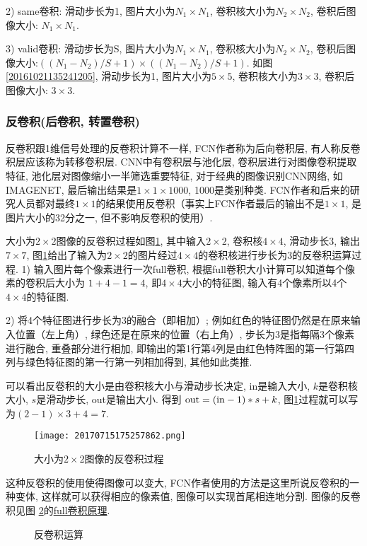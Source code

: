 2) same卷积: 滑动步长为1, 图片大小为$N_1\times N_1$, 卷积核大小为$N_2\times N_2$, 卷积后图像大小: $N_1\times N_1$.

3) valid卷积: 滑动步长为S, 图片大小为$N_1\times N_1$, 卷积核大小为$N_2\times N_2$, 卷积后图像大小:$((N_1-N_2)/S+1) \times ((N_1-N_2)/S+1)$.
如图 \ref{20161021135241205}, 滑动步长为1, 图片大小为$5\times 5$, 卷积核大小为$3\times 3$, 卷积后图像大小: $3\times 3$.

\subsubsection{反卷积(后卷积, 转置卷积)}

反卷积跟1维信号处理的反卷积计算不一样, FCN作者称为后向卷积层, 有人称反卷积层应该称为转移卷积层.
CNN中有卷积层与池化层, 卷积层进行对图像卷积提取特征, 池化层对图像缩小一半筛选重要特征, 对于经典的图像识别CNN网络, 如IMAGENET, 最后输出结果是$1\times 1\times 1000$, 1000是类别种类.
FCN作者和后来的研究人员都对最终$1\times 1$的结果使用反卷积（事实上FCN作者最后的输出不是$1\times 1$, 是图片大小的32分之一, 但不影响反卷积的使用）.
\begin{example}
大小为$2\times 2$图像的反卷积过程如图\ref{20170715175257862}, 其中输入$2\times 2$, 卷积核$4\times 4$, 滑动步长3, 输出$7\times 7$, 图\ref{20170715175257862}给出了输入为$2\times 2$的图片经过$4\times 4$的卷积核进行步长为3的反卷积运算过程.
1) 输入图片每个像素进行一次full卷积, 根据full卷积大小计算可以知道每个像素的卷积后大小为 $1+4-1=4$,  即$4\times 4$大小的特征图, 输入有4个像素所以4个$4\times 4$的特征图.

2) 将4个特征图进行步长为3的融合（即相加）; 例如红色的特征图仍然是在原来输入位置（左上角）, 绿色还是在原来的位置（右上角）, 步长为3是指每隔3个像素进行融合, 重叠部分进行相加, 即输出的第1行第4列是由红色特阵图的第一行第四列与绿色特征图的第一行第一列相加得到, 其他如此类推.

可以看出反卷积的大小是由卷积核大小与滑动步长决定, in是输入大小, $k$是卷积核大小, $s$是滑动步长, out是输出大小.
得到 $\textup{out} = (\textup{in} - 1) * s + k$, 图\ref{20170715175257862}过程就可以写为$(2 - 1)\times 3 + 4 = 7$.
\begin{figure}[H]
\centering
\texttt{[image: 20170715175257862.png]}
\caption{大小为$2\times 2$图像的反卷积过程}
\label{20170715175257862}
\end{figure}
\end{example}
这种反卷积的使用使得图像可以变大, FCN作者使用的方法是这里所说反卷积的一种变体, 这样就可以获得相应的像素值, 图像可以实现首尾相连地分割. 图像的反卷积见图 \ref{Dconop0203}的\href{https://github.com/vdumoulin/conv_arithmetic}{full卷积原理}.
\begin{figure}[H]
\centering
{}
\caption{反卷积运算}
\label{Dconop0203}
\end{figure}
